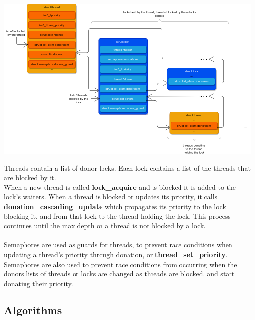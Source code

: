 \documentclass{report}
\newcommand{\fun}[1]{\textcolor{Emerald}{\textbf{#1}}}
\begin{document}
                \begin{center}
                    \includegraphics[width=\textwidth]{donation.png}
                \end{center}
                Threads contain a list of donor locks. Each lock contains a list of the threads that are blocked by it.\\
                When a new thread is called \fun{lock\_acquire} and is blocked it is added to the lock's waiters. When a 
                thread is blocked or updates its priority, it calls \fun{donation\_cascading\_update} which propagates its 
                priority to the lock blocking it, and from that lock to the thread holding the lock. This process continues 
                until the max depth or a thread is not blocked by a lock.
                \\ \\ Semaphores are used as guards for threads, to prevent race conditions when updating a thread's priority 
                through donation, or \fun{thread\_set\_priority}. Semaphores are also used to prevent race conditions from 
                occurring when the donors lists of threads or locks are changed as threads are blocked, and start donating 
                their priority.

            \subsection*{Algorithms}
\end{document}
